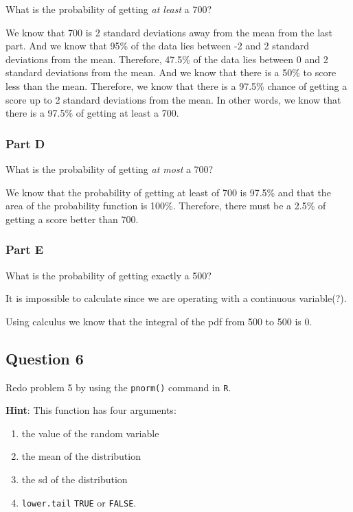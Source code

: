 \documentclass[
  letterpaper,
  DIV=11,
  numbers=noendperiod]{scrartcl}
\providecommand{\tightlist}{%
  \setlength{\itemsep}{0pt}\setlength{\parskip}{0pt}}\usepackage{longtable,booktabs,array}
\begin{document}
What is the probability of getting \emph{at least} a 700?

We know that 700 is 2 standard deviations away from the mean from the
last part. And we know that 95\% of the data lies between -2 and 2
standard deviations from the mean. Therefore, 47.5\% of the data lies
between 0 and 2 standard deviations from the mean. And we know that
there is a 50\% to score less than the mean. Therefore, we know that
there is a 97.5\% chance of getting a score up to 2 standard deviations
from the mean. In other words, we know that there is a 97.5\% of getting
at least a 700.\\

\hypertarget{part-d-1}{%
\subsubsection{Part D}\label{part-d-1}}

What is the probability of getting \emph{at most} a 700?

We know that the probability of getting at least of 700 is 97.5\% and
that the area of the probability function is 100\%. Therefore, there
must be a 2.5\% of getting a score better than 700.\\

\hypertarget{part-e-1}{%
\subsubsection{Part E}\label{part-e-1}}

What is the probability of getting exactly a 500?

It is impossible to calculate since we are operating with a continuous
variable(?).

Using calculus we know that the integral of the pdf from 500 to 500 is
0.

\hypertarget{question-6}{%
\subsection{Question 6}\label{question-6}}

Redo problem 5 by using the \texttt{pnorm()} command in \texttt{R}.

\textbf{Hint}: This function has four arguments:

\begin{enumerate}
\def\labelenumi{\arabic{enumi}.}
\tightlist
\item
  the value of the random variable
\item
  the mean of the distribution
\item
  the sd of the distribution
\item
  \texttt{lower.tail} \texttt{TRUE} or \texttt{FALSE}.
\end{enumerate}
\end{document}
